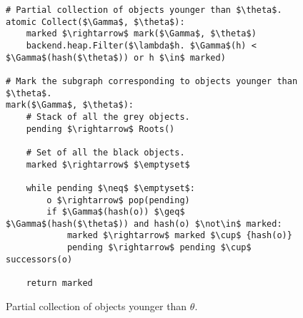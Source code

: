 \begin{figure}[!ht]
  \caption{Partial collection of objects younger than $\theta$.}
  \label{alg:partial-gen}

  \centering
  \begin{lstlisting}
# Partial collection of objects younger than $\theta$.
atomic Collect($\Gamma$, $\theta$):
    marked $\rightarrow$ mark($\Gamma$, $\theta$)
    backend.heap.Filter($\lambda$h. $\Gamma$(h) < $\Gamma$(hash($\theta$)) or h $\in$ marked)

# Mark the subgraph corresponding to objects younger than $\theta$.
mark($\Gamma$, $\theta$):
    # Stack of all the grey objects.
    pending $\rightarrow$ Roots()

    # Set of all the black objects.
    marked $\rightarrow$ $\emptyset$

    while pending $\neq$ $\emptyset$:
        o $\rightarrow$ pop(pending)
        if $\Gamma$(hash(o)) $\geq$ $\Gamma$(hash($\theta$)) and hash(o) $\not\in$ marked:
            marked $\rightarrow$ marked $\cup$ {hash(o)}
            pending $\rightarrow$ pending $\cup$ successors(o)

    return marked
\end{lstlisting}
\end{figure}
